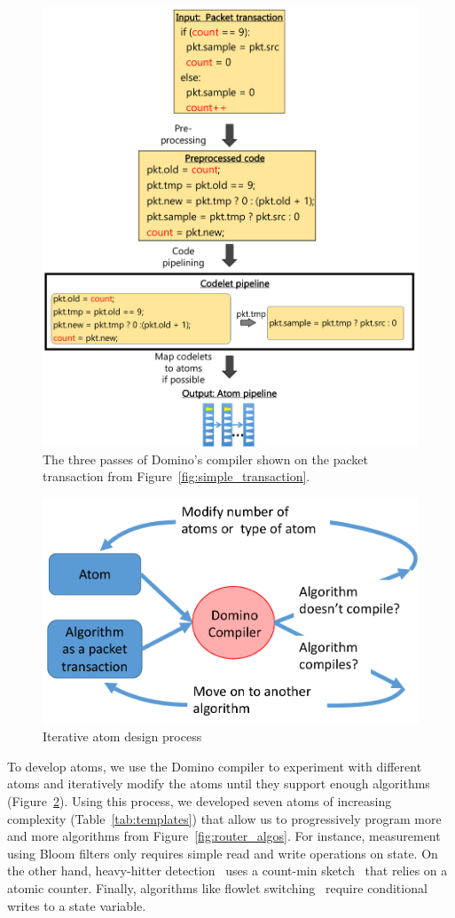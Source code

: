 \begin{figure}[!t]
\includegraphics[width=\textwidth]{compiler_passes_example.pdf}
\caption{The three passes of Domino's compiler shown on the packet transaction from Figure~\ref{fig:simple_transaction}.}
\label{fig:compiler_passes_example}
\end{figure}

\begin{figure}
\centering
\includegraphics[width=0.5\columnwidth]{iterative_design_process.pdf}
\caption{Iterative atom design process}
\label{fig:iterative_design}
\end{figure}

To develop atoms, we use the Domino compiler to experiment with different atoms
and iteratively modify the atoms until they support enough algorithms
(Figure~\ref{fig:iterative_design}).  Using this process, we developed seven
atoms of increasing complexity (Table~\ref{tab:templates}) that allow us to
progressively program more and more algorithms from
Figure~\ref{fig:router_algos}. For instance, measurement using Bloom filters
only requires simple read and write operations on state. On the other hand,
heavy-hitter detection~\cite{opensketch} uses a count-min sketch~\cite{cormode}
that relies on a atomic counter. Finally, algorithms like flowlet
switching~\cite{flowlets} require conditional writes to a state variable.

